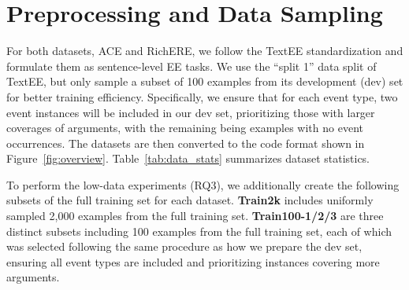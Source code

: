 \section{Preprocessing and Data Sampling}
\label{sec:appendix_preprocessing}
For both datasets, ACE and RichERE, we follow the TextEE standardization \cite{huang2024textee} and formulate them as sentence-level EE tasks. We use the ``split 1'' data split of TextEE, but only sample a subset of 100 examples from its development (dev) set for better training efficiency. Specifically, we ensure that for each event type, two event instances will be included in our dev set, prioritizing those with larger coverages of arguments, with the remaining being examples with no event occurrences. The datasets are then converted to the code format shown in Figure~\ref{fig:overview}. Table~\ref{tab:data_stats} summarizes dataset statistics.


To perform the low-data experiments (RQ3), we additionally create the following subsets of the full training set for each dataset. \textbf{Train2k} includes uniformly sampled 2,000 examples from the full training set. \textbf{Train100-1/2/3} are three distinct subsets including 100 examples from the full training set, each of which was selected following the same procedure as how we prepare the dev set, ensuring all event types are included and prioritizing instances covering more arguments.
